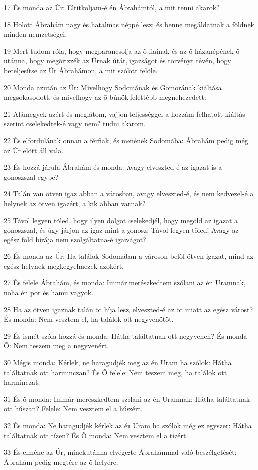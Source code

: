 \par 17 És monda az Úr: Eltitkoljam-é én Ábrahámtól, a mit tenni akarok?
\par 18 Holott Ábrahám nagy és hatalmas néppé lesz; és benne megáldatnak a földnek minden nemzetségei.
\par 19 Mert tudom róla, hogy megparancsolja az õ fiainak és az õ házanépének õ utánna, hogy megõrizzék az Úrnak útát, igazságot és törvényt tévén, hogy beteljesítse az Úr Ábrahámon, a mit szólott felõle.
\par 20 Monda azután az Úr: Mivelhogy Sodomának és Gomorának kiáltása megsokasodott, és mivelhogy az õ bûnök felettébb megnehezedett:
\par 21 Alámegyek azért és meglátom, vajjon teljességgel a hozzám felhatott kiáltás szerint cselekedtek-é vagy nem? tudni akarom.
\par 22 És elfordulának onnan a férfiak, és menének Sodomába: Ábrahám pedig még az Úr elõtt áll vala.
\par 23 És hozzá járula Ábrahám és monda: Avagy elveszted-é az igazat is a gonoszszal egybe?
\par 24 Talán van ötven igaz abban a városban, avagy elveszted-é, és nem kedvezel-é a helynek az ötven igazért, a kik abban vannak?
\par 25 Távol legyen tõled, hogy ilyen dolgot cselekedjél, hogy megöld az igazat a gonoszszal, és úgy járjon az igaz mint a gonosz: Távol legyen tõled! Avagy az egész föld bírája nem szolgáltatna-é igazságot?
\par 26 És monda az Úr: Ha találok Sodomában a városon belõl ötven igazat, mind az egész helynek megkegyelmezek azokért.
\par 27 És felele Ábrahám, és monda: Immár merészkedtem szólani az én Uramnak, noha én por és hamu vagyok.
\par 28 Ha az ötven igaznak talán öt híja lesz, elveszted-é az öt miatt az egész várost? És monda: Nem vesztem el, ha találok ott negyvenötöt.
\par 29 És ismét szóla hozzá és monda: Hátha találtatnak ott negyvenen? És monda Õ: Nem teszem meg a negyvenért.
\par 30 Mégis monda: Kérlek, ne haragudjék meg az én Uram ha szólok: Hátha találtatnak ott harminczan? És Õ felele: Nem teszem meg, ha találok ott harminczat.
\par 31 És õ monda: Immár merészkedtem szólani az én Uramnak: Hátha találtatnak ott húszan? Felele: Nem vesztem el a húszért.
\par 32 És monda: Ne haragudjék kérlek az én Uram ha szólok még ez egyszer: Hátha találtatnak ott tízen? És Õ monda: Nem vesztem el a tízért.
\par 33 És elméne az Úr, minekutánna elvégezte Ábrahámmal való beszélgetését; Ábrahám pedig megtére az õ helyére.

